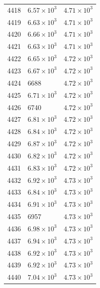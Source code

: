 \begin{table}[H]
\begin{tabular}{lll}
4418 & $\displaystyle 6.57 \times 10^{3}$ & $\displaystyle 4.71 \times 10^{3}$ \\
4419 & $\displaystyle 6.63 \times 10^{3}$ & $\displaystyle 4.71 \times 10^{3}$ \\
4420 & $\displaystyle 6.66 \times 10^{3}$ & $\displaystyle 4.71 \times 10^{3}$ \\
4421 & $\displaystyle 6.63 \times 10^{3}$ & $\displaystyle 4.71 \times 10^{3}$ \\
4422 & $\displaystyle 6.65 \times 10^{3}$ & $\displaystyle 4.72 \times 10^{3}$ \\
4423 & $\displaystyle 6.67 \times 10^{3}$ & $\displaystyle 4.72 \times 10^{3}$ \\
4424 & 6688 & $\displaystyle 4.72 \times 10^{3}$ \\
4425 & $\displaystyle 6.71 \times 10^{3}$ & $\displaystyle 4.72 \times 10^{3}$ \\
4426 & 6740 & $\displaystyle 4.72 \times 10^{3}$ \\
4427 & $\displaystyle 6.81 \times 10^{3}$ & $\displaystyle 4.72 \times 10^{3}$ \\
4428 & $\displaystyle 6.84 \times 10^{3}$ & $\displaystyle 4.72 \times 10^{3}$ \\
4429 & $\displaystyle 6.87 \times 10^{3}$ & $\displaystyle 4.72 \times 10^{3}$ \\
4430 & $\displaystyle 6.82 \times 10^{3}$ & $\displaystyle 4.72 \times 10^{3}$ \\
4431 & $\displaystyle 6.83 \times 10^{3}$ & $\displaystyle 4.72 \times 10^{3}$ \\
4432 & $\displaystyle 6.92 \times 10^{3}$ & $\displaystyle 4.73 \times 10^{3}$ \\
4433 & $\displaystyle 6.84 \times 10^{3}$ & $\displaystyle 4.73 \times 10^{3}$ \\
4434 & $\displaystyle 6.91 \times 10^{3}$ & $\displaystyle 4.73 \times 10^{3}$ \\
4435 & 6957 & $\displaystyle 4.73 \times 10^{3}$ \\
4436 & $\displaystyle 6.98 \times 10^{3}$ & $\displaystyle 4.73 \times 10^{3}$ \\
4437 & $\displaystyle 6.94 \times 10^{3}$ & $\displaystyle 4.73 \times 10^{3}$ \\
4438 & $\displaystyle 6.92 \times 10^{3}$ & $\displaystyle 4.73 \times 10^{3}$ \\
4439 & $\displaystyle 6.92 \times 10^{3}$ & $\displaystyle 4.73 \times 10^{3}$ \\
4440 & $\displaystyle 7.04 \times 10^{3}$ & $\displaystyle 4.73 \times 10^{3}$ \\

\end{tabular}
\end{table}
